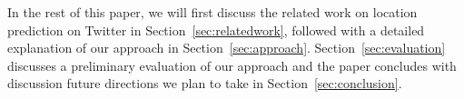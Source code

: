 In the rest of this paper, we will first discuss the related work on location prediction on Twitter in Section~\ref{sec:relatedwork}, followed with a detailed explanation of our approach in Section~\ref{sec:approach}. Section~\ref{sec:evaluation} discusses a preliminary evaluation of our approach and the paper concludes with discussion future directions we plan to take in Section~\ref{sec:conclusion}. 
 
 




